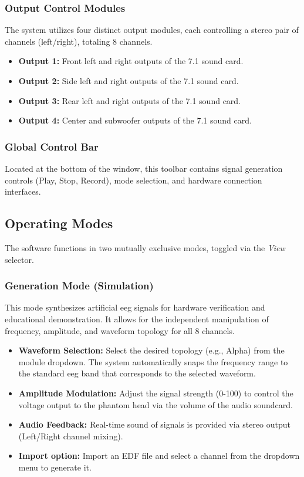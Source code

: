 \subsubsection{Output Control Modules}
The system utilizes four distinct output modules, each controlling a stereo pair of channels (left/right), totaling 8 channels.
\begin{itemize}
    \item \textbf{Output 1:} Front left and right outputs of the 7.1 sound card.
    \item \textbf{Output 2:} Side left and right outputs of the 7.1 sound card.
    \item \textbf{Output 3:} Rear left and right outputs of the 7.1 sound card.
    \item \textbf{Output 4:} Center and subwoofer outputs of the 7.1 sound card.
\end{itemize}

\subsubsection{Global Control Bar}
Located at the bottom of the window, this toolbar contains signal generation controls (Play, Stop, Record), mode selection, and hardware connection interfaces.

\subsection{Operating Modes}

The software functions in two mutually exclusive modes, toggled via the \textit{View} selector.

\subsubsection{Generation Mode (Simulation)}
This mode synthesizes artificial \gls{eeg} signals for hardware verification and educational demonstration. It allows for the independent manipulation of frequency, amplitude, and waveform topology for all 8 channels.
\begin{itemize}
    \item \textbf{Waveform Selection:} Select the desired topology (e.g., Alpha) from the module dropdown. The system automatically snaps the frequency range to the standard \gls{eeg} band that corresponds to the selected waveform.
    \item \textbf{Amplitude Modulation:} Adjust the signal strength (0{-}100) to control the voltage output to the phantom head via the volume of the audio soundcard.
    \item \textbf{Audio Feedback:} Real-time sound of signals is provided via stereo output (Left/Right channel mixing).
    \item \textbf{Import option:} Import an EDF file and select a channel from the dropdown menu to generate it.
\end{itemize}

